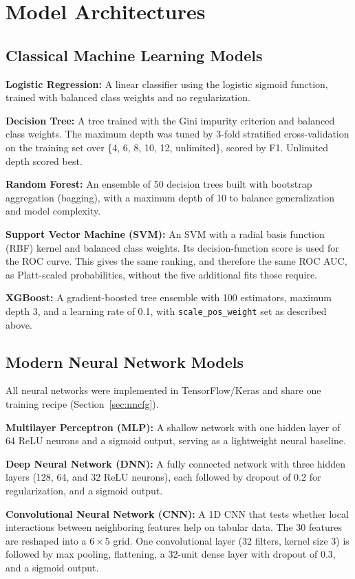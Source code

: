 \documentclass[journal]{IEEEtran}
\begin{document}
\section{Model Architectures}
\subsection{Classical Machine Learning Models}
\textbf{Logistic Regression:} A linear classifier using the logistic sigmoid function, trained with balanced class weights and no regularization.

\textbf{Decision Tree:} A tree trained with the Gini impurity criterion and balanced class weights. The maximum depth was tuned by 3-fold stratified cross-validation on the training set over \{4, 6, 8, 10, 12, unlimited\}, scored by F1. Unlimited depth scored best.

\textbf{Random Forest:} An ensemble of 50 decision trees built with bootstrap aggregation (bagging), with a maximum depth of 10 to balance generalization and model complexity.

\textbf{Support Vector Machine (SVM):} An SVM with a radial basis function (RBF) kernel and balanced class weights. Its decision-function score is used for the ROC curve. This gives the same ranking, and therefore the same ROC AUC, as Platt-scaled probabilities, without the five additional fits those require.

\textbf{XGBoost:} A gradient-boosted tree ensemble with 100 estimators, maximum depth 3, and a learning rate of 0.1, with \texttt{scale\_pos\_weight} set as described above.

\subsection{Modern Neural Network Models}
All neural networks were implemented in TensorFlow/Keras and share one training recipe (Section~\ref{sec:nncfg}).

\textbf{Multilayer Perceptron (MLP):} A shallow network with one hidden layer of 64 ReLU neurons and a sigmoid output, serving as a lightweight neural baseline.

\textbf{Deep Neural Network (DNN):} A fully connected network with three hidden layers (128, 64, and 32 ReLU neurons), each followed by dropout of 0.2 for regularization, and a sigmoid output.

\textbf{Convolutional Neural Network (CNN):} A 1D CNN that tests whether local interactions between neighboring features help on tabular data. The 30 features are reshaped into a $6 \times 5$ grid. One convolutional layer (32 filters, kernel size 3) is followed by max pooling, flattening, a 32-unit dense layer with dropout of 0.3, and a sigmoid output.
\end{document}
